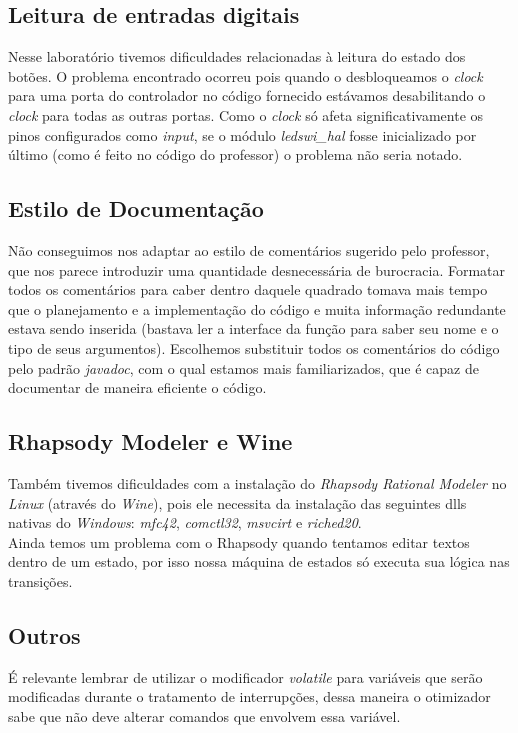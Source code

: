 \documentclass{article}
\begin{document}
\subsection{Leitura de entradas digitais}
Nesse laboratório tivemos dificuldades relacionadas à leitura do estado dos botões. O problema encontrado ocorreu pois quando o desbloqueamos o \textit{clock} para uma porta do controlador no código fornecido estávamos desabilitando o \textit{clock} para todas as outras portas. Como o \textit{clock} só afeta significativamente os pinos configurados como \textit{input}, se o módulo \textit{ledswi\_hal} fosse inicializado por último (como é feito no código do professor) o problema não seria notado.

\subsection{Estilo de Documentação}
Não conseguimos nos adaptar ao estilo de comentários sugerido pelo professor, que nos parece introduzir uma quantidade desnecessária de burocracia. Formatar todos os comentários para caber dentro daquele quadrado tomava mais tempo que o planejamento e a implementação do código e muita informação redundante estava sendo inserida (bastava ler a interface da função para saber seu nome e o tipo de seus argumentos). Escolhemos substituir todos os comentários do código pelo padrão \textit{javadoc}, com o qual estamos mais familiarizados, que é capaz de documentar de maneira eficiente o código.

\subsection{Rhapsody Modeler e Wine}
Também tivemos dificuldades com a instalação do \textit{Rhapsody Rational Modeler} no \textit{Linux} (através do \textit{Wine}), pois ele necessita da instalação das seguintes dlls nativas do \textit{Windows}: \textit{mfc42}, \textit{comctl32}, \textit{msvcirt} e \textit{riched20}.\\
Ainda temos um problema com o Rhapsody quando tentamos editar textos dentro de um estado, por isso nossa máquina de estados só executa sua lógica nas transições.

\subsection{Outros}
 É relevante lembrar de utilizar o modificador \textit{volatile} para variáveis que serão modificadas durante o tratamento de interrupções, dessa maneira o otimizador sabe que não deve alterar comandos que envolvem essa variável.
 
\end{document}
